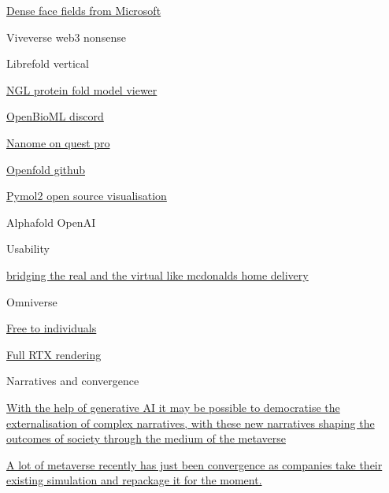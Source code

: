        
        \href{https://microsoft.github.io/DenseLandmarks/}{Dense face
        fields from Microsoft}
       
     
      Viveverse web3 nonsense
     
   
    Librefold vertical

     
    \tightlist
     
      \href{https://github.com/nglviewer/ngl}{NGL protein fold model
      viewer}
     
      \href{discord.gg/AMRdyPjwBb}{OpenBioML discord}
     
      \href{https://www.youtube.com/watch?v=Q-V5EQ-FBMc}{Nanome on quest
      pro}
     
      \href{https://github.com/aqlaboratory/openfold}{Openfold github}
     
      \href{https://github.com/schrodinger/pymol-open-source}{Pymol2
      open source visualisation}
     
      Alphafold OpenAI

       
      \tightlist
       
       
     
   
    Usability

     
    \tightlist
     
      \href{https://www.businessinsider.com/mcdonalds-metaverse-virtual-online-restaurant-trademark-delivers-food-web3-nft-2022-2}{bridging
      the real and the virtual like mcdonalds home delivery}
     
   
    Omniverse

     
    \tightlist
     
      \href{https://blogs.nvidia.com/blog/2022/01/04/omniverse-available-free-to-creators/}{Free
      to individuals}
     
      \href{https://www.youtube.com/watch?v=Jm155QkRjl0\&feature=youtu.be}{Full
      RTX rendering}
     
   
    Narratives and convergence

     
    \tightlist
     
      \href{https://www.epsilontheory.com/narrative-and-metaverse-pt-3-the-luther-protocol/\#.YjyHbnLIE5k.twitter}{With
      the help of generative AI it may be possible to democratise the
      externalisation of complex narratives, with these new narratives
      shaping the outcomes of society through the medium of the
      metaverse}
     
      \href{https://thedriven.io/2022/05/23/nissan-and-mitsubishi-unveil-electric-mini-vehicles-and-test-drives-in-metaverse/}{A
      lot of metaverse recently has just been convergence as companies
      take their existing simulation and repackage it for the moment.}
     

